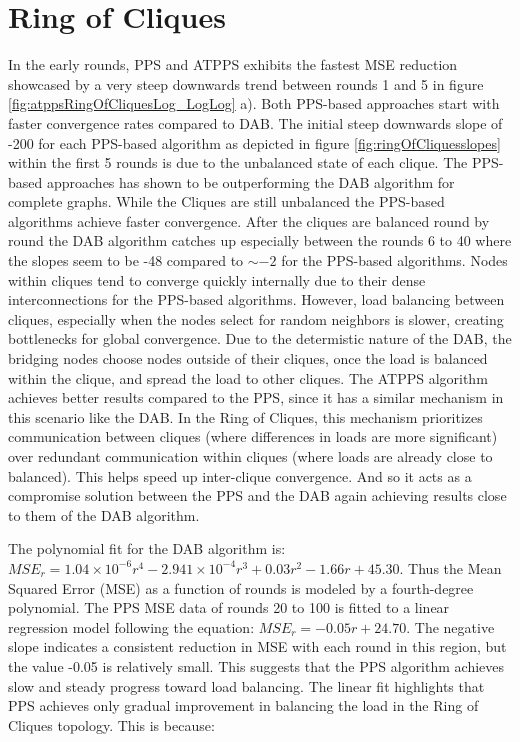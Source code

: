 \section{Ring of Cliques}\label{sec:ringofcliques}
In the early rounds, PPS and ATPPS exhibits the fastest MSE reduction showcased by a very steep downwards trend between rounds 1 and 5 in figure \ref{fig:atppsRingOfCliquesLog_LogLog} a). Both PPS-based approaches start with faster convergence rates compared to DAB. The initial steep downwards slope of -200 for each PPS-based algorithm as depicted in figure \ref{fig:ringOfCliquesslopes} within the first 5 rounds is due to the unbalanced state of each clique. The PPS-based approaches has shown to be outperforming the DAB algorithm for complete graphs. While the Cliques are still unbalanced the PPS-based algorithms achieve faster convergence. After the cliques are balanced round by round the DAB algorithm catches up especially between the rounds 6 to 40 where the slopes seem to be -48 compared to $\sim-2$ for the PPS-based algorithms.  Nodes within cliques tend to converge quickly internally due to their dense interconnections for the PPS-based algorithms. However, load balancing between cliques, especially when the nodes select for random neighbors is slower, creating bottlenecks for global convergence. Due to the determistic nature of the DAB, the bridging nodes choose nodes outside of their cliques, once the load is balanced within the clique, and spread the load to other cliques. The ATPPS algorithm achieves better results compared to the PPS, since it has a similar mechanism in this scenario like the DAB. In the Ring of Cliques, this mechanism prioritizes communication between cliques (where differences in loads are more significant) over redundant communication within cliques (where loads are already close to balanced). This helps speed up inter-clique convergence. And so it acts as a compromise solution between the PPS and the DAB again achieving results close to them of the DAB algorithm.

The polynomial fit for the DAB algorithm is: $MSE_r=1.04\times 10^{-6}r^{4}-2.941\times 10^{-4}r^{3}+0.03r^{2}-1.66r+45.30$. Thus the Mean Squared Error (MSE) as a function of rounds is modeled by a fourth-degree polynomial. The PPS MSE data of rounds 20 to 100 is fitted to a linear regression model following the equation: $MSE_r=-0.05r+24.70$. The negative slope indicates a consistent reduction in MSE with each round in this region, but the value -0.05 is relatively small. This suggests that the PPS algorithm achieves slow and steady progress toward load balancing. The linear fit highlights that PPS achieves only gradual improvement in balancing the load in the Ring of Cliques topology. This is because:

